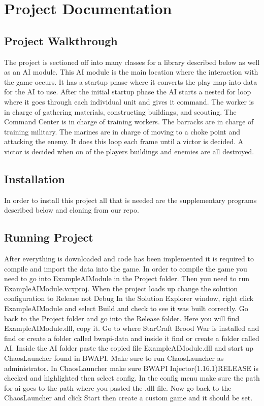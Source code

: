 \documentclass[10pt,letterpaper,onecolumn,draftclsnofoot]{IEEEtran}
\begin{document}
\newpage

\section{Project Documentation}
\subsection{Project Walkthrough}
The project is sectioned off into many classes for a library described below as well as an AI module. This AI module is the main location where the interaction with the game occurs. It has a startup phase where it converts the play map into data for the AI to use. After the initial startup phase the AI starts a nested for loop where it goes through each individual unit and gives it command. The worker is in charge of gathering materials, constructing buildings, and scouting. The Command Center is in charge of training workers. The barracks are in charge of training military. The marines are in charge of moving to a choke point and attacking the enemy. It does this loop each frame until a victor is decided. A victor is decided when on of the players buildings and enemies are all destroyed.
\subsection{Installation}
In order to install this project all that is needed are the supplementary programs described below and cloning from our repo.
\subsection{Running Project}
After everything is downloaded and code has been implemented it is required to compile and import the data into the game. In order to compile the game you need to go into ExampleAIModule in the Project folder. Then you need to run ExampleAIModule.vcxproj. When the project loads up change the solution configuration to Release not Debug In the Solution Explorer window, right click ExampleAIModule and select Build and check to see it was built correctly. Go back to the Project folder and go into the Release folder. Here you will find ExampleAIModule.dll, copy it. Go to where StarCraft Brood War is installed and find or create a folder called bwapi-data and inside it find or create a folder called AI. Inside the AI folder paste the copied file ExampleAIModule.dll and start up ChaosLauncher found in BWAPI. Make sure to run ChaosLauncher as administrator. In ChaosLauncher make sure BWAPI Injector(1.16.1)RELEASE is checked and highlighted then select config. In the config menu make sure the path for ai goes to the path where you pasted the .dll file. Now go back to the ChaosLauncher and click Start then create a custom game and it should be set.
\end{document}
